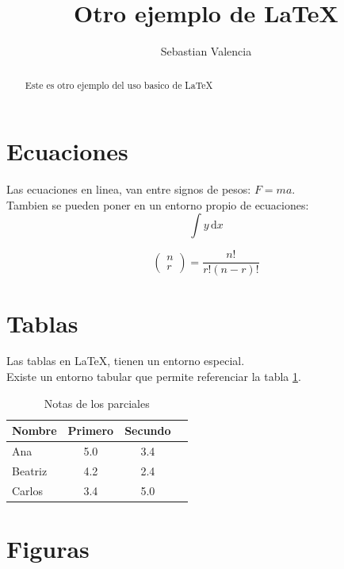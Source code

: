 \documentclass{article}
\author{Sebastian Valencia}
\title{Otro ejemplo de \LaTeX}
\begin{document}
\maketitle

\begin{abstract}
Este es otro ejemplo del uso basico de \LaTeX

\end{abstract}

\section{Ecuaciones}
Las ecuaciones en linea, van entre signos de pesos: $F = ma$.\\
Tambien se pueden poner en un entorno propio de ecuaciones:
\begin{equation}
\int y\, \mathrm{d}x
\end{equation}

\begin{equation*}
\left(\!
	\begin{array}
		{c}
      	n \\
      	r
    \end{array}
\!\right) = \frac{n!}{r!(n-r)!}
\end{equation*}

\section{Tablas}
Las tablas en \LaTeX, tienen un entorno especial. \\
Existe un entorno tabular que permite referenciar la tabla \ref{Ta: Notas}. \\

\begin{table}[h] %
\centering
	\begin{tabular}{| l | c | c | c}
		\hline
		Nombre & Primero & Secundo \\ \hline
		Ana & 5.0 & 3.4 \\ \hline
		Beatriz & 4.2 & 2.4 \\ \hline
		Carlos & 3.4 & 5.0 \\ \hline
	\end{tabular}
\caption{Notas de los parciales}
\label{Ta: Notas}
\end{table}

\pagebreak

\section{Figuras}
\end{document}
